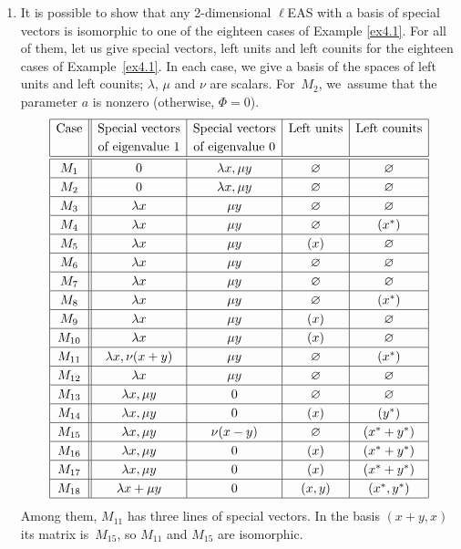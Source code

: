 \documentclass[pdftex]{sigma}
\numberwithin{equation}{section}
\begin{document}
\begin{Example}
\begin{enumerate}
\item[(2)] It is possible to show that any 2-dimensional $\ell$EAS with a basis of special vectors is isomorphic to one of the eighteen cases of Example \ref{ex4.1}.
For all of them, let us give special vectors, left units and left counits for the eighteen cases of Example~\ref{ex4.1}.
In each case, we give a basis of the spaces of left units and left counits; $\lambda$, $\mu$ and $\nu$ are scalars. For~$M_2$, we~assume that the parameter $a$ is nonzero (otherwise, $\Phi=0$).
$$\renewcommand{\arraystretch}{1.2} \begin{array}{|c||c|c|c|c|}
\hline \text{Case}&\text{Special vectors}&\text{Special vectors}&\text{Left units}&\text{Left counits}\\
&\text{of eigenvalue 1}&\text{of eigenvalue 0}&&\\
\hline\hline M_1&0&\lambda x, \mu y&\varnothing&\varnothing\\
\hline M_2&0&\lambda x, \mu y&\varnothing&\varnothing\\
\hline M_3&\lambda x&\mu y&\varnothing&\varnothing\\
\hline M_4&\lambda x&\mu y&\varnothing& (x^*)\\
\hline M_5&\lambda x&\mu y&(x)&\varnothing\\
\hline M_6&\lambda x&\mu y&\varnothing&\varnothing\\
\hline M_7&\lambda x&\mu y&\varnothing&\varnothing\\
\hline M_8&\lambda x&\mu y&\varnothing& (x^*)\\
\hline M_9&\lambda x&\mu y&(x)&\varnothing\\
\hline M_{10}&\lambda x&\mu y&(x)&\varnothing\\
\hline M_{11}&\lambda x,\nu(x+y)&\mu y&\varnothing& (x^*)\\
\hline M_{12}&\lambda x&\mu y&\varnothing&\varnothing\\
\hline M_{13}&\lambda x, \mu y&0&\varnothing&\varnothing\\
\hline M_{14}&\lambda x, \mu y&0&(x)&(y^*)\\
\hline M_{15}&\lambda x, \mu y&\nu(x-y)&\varnothing&(x^*+y^*)\\
\hline M_{16}&\lambda x, \mu y&0&(x)&(x^*+y^*)\\
\hline M_{17}&\lambda x, \mu y&0&(x)&(x^*+y^*)\\
\hline M_{18}&\lambda x+\mu y&0&(x,y)&(x^*,y^*)\\
\hline \end{array}$$
Among them, $M_{11}$ has three lines of special vectors. In the basis $(x+y,x)$ its matrix is~$M_{15}$, so $M_{11}$ and $M_{15}$ are isomorphic.
\end{enumerate}\end{Example}
\end{document}
